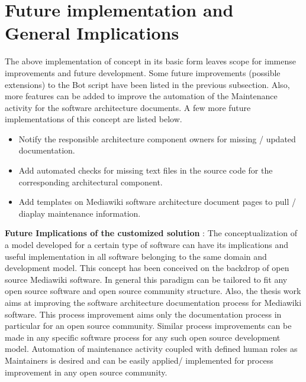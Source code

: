 \section{Future implementation and General Implications }
The above implementation of concept in its basic form leaves scope for immense improvements and future development. Some future improvements (possible extensions) to the Bot script have been listed in the previous subsection. Also, more features can be added to improve the automation of the Maintenance activity for the software architecture documents.
\newline A few more future implementations of this concept are listed below.
\begin{itemize}
\item Notify the responsible architecture component owners for missing / updated documentation.
\item Add automated checks for missing text files in the source code for the corresponding architectural component. 
\item Add templates on Mediawiki software architecture document pages to pull / diaplay maintenance information.
\end{itemize}

\textbf{Future Implications of the customized solution} : 
\newline The conceptualization of a model developed for a certain type of software can have its implications and useful implementation in all software belonging to the same domain and development model.
\newline This concept has been conceived on the backdrop of open source Mediawiki software. In general this paradigm can be tailored to fit any open source software and open source community structure. Also, the thesis work aims at improving the software architecture documentation process for Mediawiki software. 
\newline This process improvement aims only the documentation process in particular for an open source community. Similar process improvements can be made in any specific software process for any such open source development model. Automation of maintenance activity coupled with defined human roles as Maintainers is desired and can be easily applied/ implemented for process improvement in any open source community.